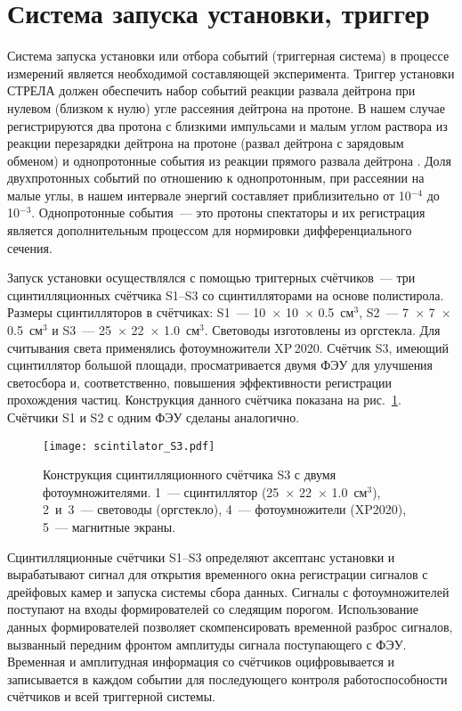 \section{Система запуска установки, триггер}
\label{section:trigger}
Система запуска установки или отбора событий (триггерная система) в процессе
измерений является необходимой составляющей эксперимента. Триггер установки
СТРЕЛА должен обеспечить набор событий реакции развала дейтрона при нулевом
(близком к нулю) угле рассеяния дейтрона на протоне. В нашем случае
регистрируются два протона с близкими импульсами и малым углом раствора из
реакции перезарядки дейтрона на протоне \dpchex (развал дейтрона с зарядовым
обменом) и однопротонные события из реакции прямого развала дейтрона \dpret.
Доля двухпротонных событий по отношению к однопротонным, при рассеянии на малые
углы, в нашем интервале энергий составляет приблизительно от 10$^{-4}$ до
10$^{-3}$. Однопротонные события~--- это протоны спектаторы и их регистрация
является дополнительным процессом для нормировки дифференциального сечения.

Запуск установки осуществлялся с помощью триггерных счётчиков~--- три
сцинтилляционных счётчика S1--S3 со сцинтилляторами на основе полистирола.
Размеры сцинтилляторов в счётчиках: S1~--- 10~$\times$ 10~$\times$ 0.5~см$^3$,
S2~--- 7~$\times$ 7~$\times$ 0.5~см$^3$ и S3~--- 25~$\times$ 22~$\times$
1.0~см$^3$. Световоды изготовлены из оргстекла. Для считывания света применялись
фотоумножители XP\,2020. Счётчик S3, имеющий сцинтиллятор большой площади,
просматривается двумя ФЭУ для улучшения светосбора и, соответственно, повышения
эффективности регистрации прохождения частиц. Конструкция данного счётчика
показана на рис.~\ref{fig:scintilator_S3}. Счётчики S1 и S2 с одним ФЭУ сделаны
аналогично.

\begin{figure}[h]
  \centering
  \texttt{[image: scintilator\_S3.pdf]}
  \caption{Конструкция сцинтилляционного счётчика S3 с двумя фотоумножителями.
    1~--- сцинтиллятор (25~$\times$ 22~$\times$ 1.0~см$^3$), 2~и~3~--- световоды
    (оргстекло), 4~--- фотоумножители (XP2020), 5~--- магнитные экраны.}
  \label{fig:scintilator_S3}
\end{figure}

Сцинтилляционные счётчики S1--S3 определяют аксептанс установки и вырабатывают
сигнал для открытия временного окна регистрации сигналов с дрейфовых камер и
запуска системы сбора данных. Сигналы с фотоумножителей
поступают на входы формирователей со следящим порогом. Использование данных
формирователей позволяет скомпенсировать временной разброс сигналов, вызванный
передним фронтом амплитуды сигнала поступающего с ФЭУ. Временная и амплитудная
информация со счётчиков оцифровывается и записывается в каждом событии для
последующего контроля работоспособности счётчиков и всей триггерной системы.

